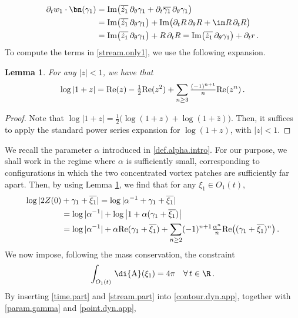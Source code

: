 \documentclass[a4paper,reqno,10pt]{article}
\newtheorem{lem}{Lemma}[section]
\newcommand{\pa}{\partial}
\newcommand{\wrta}{\,\di {\rm A}}
\begin{document}
	\begin{align}
		\pa_{t} w_1 \cdot \bn(\gamma_{1}) & = {\rm Im} \big( \overline{\dot{z}_1} \, \pa_{\theta} \gamma_{1} + \pa_{t}\overline{\gamma_{1}} \, \pa_{\theta}\gamma_{1} \big) \\
		& = {\rm Im}\big(  \overline{\dot{z}_1} \,\pa_{\theta}\gamma_{1} \big) + {\rm Im}\big( \pa_{t}R \,\pa_{\theta} R + \im R\, \pa_{t} R \big) \\
		& = {\rm Im}\big(  \overline{\dot{z}_1}\, \pa_{\theta}\gamma_{1} \big)  + R \,\pa_{t} R  = {\rm Im}\big(  \overline{\dot{z}_1}\, \pa_{\theta}\gamma_{1} \big)  + \pa_{t}r \,.\label{time.part}
	\end{align}
To compute the terms in \eqref{stream.only1}, we use the following expansion.
\begin{lem}\label{loga.expa}
	For any $|z|<1$, we have that
	\begin{equation}
		\log |1+z| = {\rm Re}(z) - \tfrac{1}{2} {\rm Re}(z^2) + \sum_{n\geq 3} \tfrac{(-1)^{n+1}}{n} {\rm Re}(z^n)\,.
	\end{equation}
\end{lem}
\begin{proof}
	Note that $\log|1+z| = \frac12\big( \log(1+z) + \log(1+\bar z) \big)$. Then, it suffices to apply the standard power series expansion for $\log(1+z)$, with $|z|<1$.
\end{proof}
We recall the parameter $\alpha$ introduced in \eqref{def.alpha.intro}. For our purpose, we shall work in the regime where $\alpha$ is sufficiently small, corresponding to configurations in which the two concentrated vortex patches are sufficiently far apart.
Then, by using  Lemma \ref{loga.expa}, we find that  for any $\xi_{1}\in O_1(t)$,
	\begin{align}
	\log |2Z(0) &+ \gamma_{1} +\overline{\xi_{1}} |  =	\log |\alpha^{-1} + \gamma_{1} +\overline{\xi_{1}} |\\
	 & = \log|\alpha^{-1}| + \log\big| 1  + \alpha(\gamma_{1}+\overline{\xi_1}) \big|  \\
	 & = \log|\alpha^{-1}| + \alpha {\rm Re}( \gamma_{1}+\overline{\xi_{1}} )  + \sum_{n\geq 2} (-1)^{n+1}\tfrac{\alpha^n}{n}{\rm Re}\big( (\gamma_{1}+\overline{\xi_{1}})^n \big) \,.
	\label{stream.part}
\end{align}
We now impose, following the mass conservation, the constraint
\begin{equation*}
	\int_{O_{1}(t)} \wrta(\xi_{1}) = 4\pi  \quad \forall\, t\in\R\,.
\end{equation*}
By inserting \eqref{time.part} and \eqref{stream.part} into \eqref{contour.dyn.app}, together with   \eqref{param.gamma} and \eqref{point.dyn.app}, 
\end{document}
